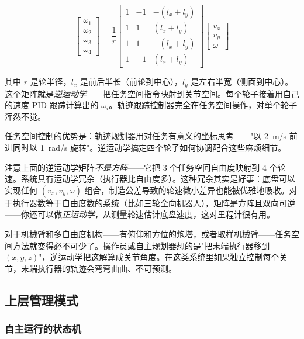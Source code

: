 \begin{equation}
\begin{bmatrix} \omega_1 \\ \omega_2 \\ \omega_3 \\ \omega_4 \end{bmatrix}
= \frac{1}{r}
\begin{bmatrix}
1 & -1 & -(l_x + l_y) \\
1 &  1 &  (l_x + l_y) \\
1 &  1 & -(l_x + l_y) \\
1 & -1 &  (l_x + l_y)
\end{bmatrix}
\begin{bmatrix} v_x \\ v_y \\ \omega \end{bmatrix}
\end{equation}

其中 $r$ 是轮半径，$l_x$ 是前后半长（前轮到中心），$l_y$ 是左右半宽（侧面到中心）。这个矩阵就是\textit{逆运动学}——把任务空间指令映射到关节空间。每个轮子接着用自己的速度 PID 跟踪计算出的 $\omega_i$。轨迹跟踪控制器完全在任务空间操作，对单个轮子浑然不觉。

任务空间控制的优势是：轨迹规划器用对任务有意义的坐标思考——"以 2~m/s 前进同时以 1~rad/s 旋转"。逆运动学搞定四个轮子如何协调配合这些麻烦细节。

注意上面的逆运动学矩阵\textit{不是方阵}——它把 3 个任务空间自由度映射到 4 个轮速。系统具有运动学冗余（执行器比自由度多）。这种冗余其实是好事：底盘可以实现任何 $(v_x, v_y, \omega)$ 组合，制造公差导致的轮速微小差异也能被优雅地吸收。对于执行器数等于自由度数的系统（比如三轮全向机器人），矩阵是方阵且双向可逆——你还可以做\textit{正运动学}，从测量轮速估计底盘速度，这对里程计很有用。

对于机械臂和多自由度机构——有俯仰和方位的炮塔，或者取样机械臂——任务空间方法就变得必不可少了。操作员或自主规划器想的是"把末端执行器移到 $(x, y, z)$"，逆运动学把这解算成关节角度。在这类系统里如果独立控制每个关节，末端执行器的轨迹会弯弯曲曲、不可预测。

\subsection{上层管理模式}

\subsubsection{自主运行的状态机}

